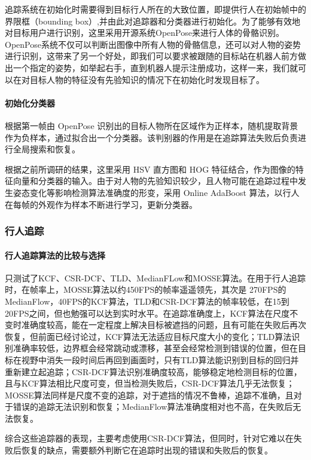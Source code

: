   追踪系统在初始化时需要得到目标行人所在的大致位置，即提供行人在初始帧中的界限框（bounding box）,并由此对追踪器和分类器进行初始化。为了能够有效地对目标用户进行识别，这里采用开源系统OpenPose\cite{cao2018openpose}来进行人体的骨骼识别。OpenPose系统不仅可以判断出图像中所有人物的骨骼信息，还可以对人物的姿势进行识别，这带来了另一个好处，即我们可以要求被跟随的目标站在机器人前方做出一个指定的姿势，如举起右手，直到机器人提示注册成功，这样一来，我们就可以在对目标人物的特征没有先验知识的情况下在初始化时发现目标了。

\paragraph{初始化分类器}
  根据第一帧由 OpenPose 识别出的目标人物所在区域作为正样本，随机提取背景作为负样本，通过拟合出一个分类器。该判别器的作用是在追踪算法失败后负责进行全局搜索和恢复。

  根据之前所调研的结果，这里采用 HSV 直方图和 HOG 特征结合，作为图像的特征向量和分类器的输入。由于对人物的先验知识较少，且人物可能在追踪过程中发生姿态变化等影响检测算法准确度的形变，采用 Online AdaBoost 算法，以行人在每帧的外观作为样本不断进行学习，更新分类器。

\subsubsection{行人追踪}

\paragraph{行人追踪算法的比较与选择}

  只测试了KCF、CSR-DCF、TLD、MedianFLow和MOSSE算法。在用于行人追踪时，在帧率上，MOSSE算法以约450FPS的帧率遥遥领先，其次是 270FPS的MedianFlow，40FPS的KCF算法，TLD和CSR-DCF算法的帧率较低，在15到20FPS之间，但也勉强可以达到实时水平。在追踪准确度上，KCF算法在尺度不变时准确度较高，能在一定程度上解决目标被遮挡的问题，且有可能在失败后再次恢复，但前面已经讨论过，KCF算法无法适应目标尺度大小的变化；TLD算法识别准确率较低，边界框会经常跳动或漂移，甚至会经常检测到错误的位置，但在目标在视野中消失一段时间后再回到画面时，只有TLD算法能识别到目标的回归并重新建立起追踪；CSR-DCF算法识别准确度较高，能够稳定地检测目标的位置，且与KCF算法相比尺度可变，但当检测失败后，CSR-DCF算法几乎无法恢复；MOSSE算法同样是尺度不变的追踪，对于遮挡的情况不鲁棒，追踪不准确，且对于错误的追踪无法识别和恢复；MedianFlow算法准确度相对也不高，在失败后无法恢复。

  综合这些追踪器的表现，主要考虑使用CSR-DCF算法，但同时，针对它难以在失败后恢复的缺点，需要额外判断它在追踪时出现的错误和失败后的恢复。


